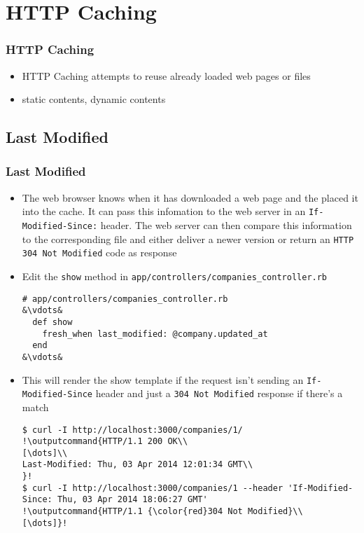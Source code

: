 \documentclass{beamer}
\newcommand{\outputcommand}[1]{\color{darkgreen}{#1}}
\begin{document}
\section{HTTP Caching}
\begin{frame}[fragile]
\frametitle{HTTP Caching}
\begin{itemize}
\item HTTP Caching attempts to reuse already loaded web pages or files
\item static contents, dynamic contents
\end{itemize}
\end{frame}


\subsection{Last Modified}
\begin{frame}
\frametitle{Last Modified}
\begin{itemize}
\item The web browser knows when it has downloaded a web page and the placed it into the cache. It can pass this infomation to the web server in an \texttt{If-Modified-Since:} header. The web server can then compare this information to the corresponding file and either deliver a newer version or return an \texttt{HTTP 304 Not Modified} code as response

\item Edit the \texttt{show} method in \texttt{app/controllers/companies\_controller.rb}

\lstset{language=Ruby, style=eclipse}
\begin{lstlisting}[escapechar=&]
# app/controllers/companies_controller.rb
&\vdots&
  def show
    fresh_when last_modified: @company.updated_at
  end
&\vdots&
\end{lstlisting}

\item This will render the show template if the request isn’t sending an \texttt{If-Modified-Since} header and just a \texttt{304 Not Modified} response if there’s a match

\lstset{language=shell}
\begin{lstlisting}[escapechar=!]
$ curl -I http://localhost:3000/companies/1/
!\outputcommand{HTTP/1.1 200 OK\\
[\dots]\\
Last-Modified: Thu, 03 Apr 2014 12:01:34 GMT\\
}!
$ curl -I http://localhost:3000/companies/1 --header 'If-Modified-Since: Thu, 03 Apr 2014 18:06:27 GMT'
!\outputcommand{HTTP/1.1 {\color{red}304 Not Modified}\\
[\dots]}!
\end{lstlisting}
\end{itemize}
\end{frame}
\end{document}
